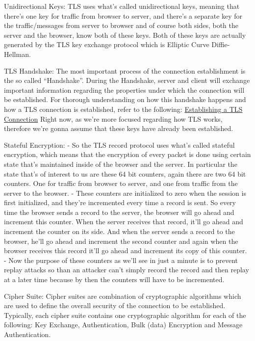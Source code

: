 \documentclass[11pt]{article}
\begin{document}
Unidirectional Keys: TLS uses what's called unidirectional keys, meaning
that there's one key for traffic from browser to server, and there's a
separate key for the traffic/messages from server to browser and of
course both sides, both the server and the browser, know both of these
keys. Both of these keys are actually generated by the TLS key exchange
protocol which is Elliptic Curve Diffie-Hellman.

TLS Handshake: The most important process of the connection
establishment is the so called ``Handshake''. During the Handshake,
server and client will exchange important information regarding the
properties under which the connection will be established. For thorough
understanding on how this handshake happens and how a TLS connection is
established, refer to the following:
\href{https://www.acunetix.com/blog/articles/establishing-tls-ssl-connection-part-5/}{Establishing
a TLS Connection} Right now, as we're more focused regarding how TLS
works, therefore we're gonna assume that these keys have already been
established.

Stateful Encryption: - So the TLS record protocol uses what's called
stateful encryption, which means that the encryption of every packet is
done using certain state that's maintained inside of the browser and the
server. In particular the state that's of interest to us are these 64
bit counters, again there are two 64 bit counters. One for traffic from
browser to server, and one from traffic from the server to the browser.
- These counters are initialized to zero when the session is first
initialized, and they're incremented every time a record is sent. So
every time the browser sends a record to the server, the browser will go
ahead and increment this counter. When the server receives that record,
it'll go ahead and increment the counter on its side. And when the
server sends a record to the browser, he'll go ahead and increment the
second counter and again when the browser receives this record it'll go
ahead and increment its copy of this counter. - Now the purpose of these
counters as we'll see in just a minute is to prevent replay attacks so
than an attacker can't simply record the record and then replay at a
later time because by then the counters will have to be incremented.

Cipher Suite: Cipher suites are combination of cryptographic algorithms
which are used to define the overall security of the connection to be
established. Typically, each cipher suite contains one cryptographic
algorithm for each of the following: Key Exchange, Authentication, Bulk
(data) Encryption and Message Authentication.
\end{document}
